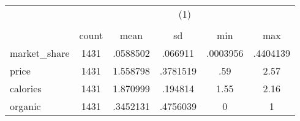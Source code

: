 {
\def\sym#1{\ifmmode^{#1}\else\(^{#1}\)\fi}
\begin{tabular}{l*{1}{ccccc}}
\hline\hline
                    &\multicolumn{5}{c}{(1)}                                         \\
                    &\multicolumn{5}{c}{}                                            \\
                    &       count&        mean&          sd&         min&         max\\
\hline
market\_share        &        1431&    .0588502&     .066911&    .0003956&    .4404139\\
price               &        1431&    1.558798&    .3781519&         .59&        2.57\\
calories            &        1431&    1.870999&     .194814&        1.55&        2.16\\
organic             &        1431&    .3452131&    .4756039&           0&           1\\
\hline\hline
\end{tabular}
}
